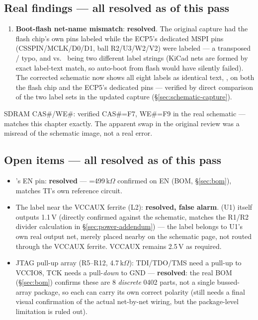 \subsection{Real findings --- all resolved as of this pass}
\begin{enumerate}
\item \textbf{Boot-flash net-name mismatch}: \textbf{resolved}. The
      original capture had the flash chip's own pins labeled
       while the ECP5's dedicated
      MSPI pins (CSSPIN/MCLK/D0/D1, ball R2/U3/W2/V2) were labeled
       --- a transposed
      / typo, and  vs.\ 
      being two different label strings (KiCad nets are formed by
      exact label-text match, so auto-boot from flash would have
      silently failed). The corrected schematic now shows all eight
      labels as identical text, ,
      on both the flash chip and the ECP5's dedicated pins --- verified
      by direct comparison of the two label sets in the updated
      capture (\S\ref{sec:schematic-capture}).
\end{enumerate}

\begin{fnnote}
SDRAM CAS\#/WE\#: verified CAS\#=F7, WE\#=F9 in the real schematic ---
matches this chapter exactly. The apparent swap in the original review
was a misread of the schematic image, not a real error.
\end{fnnote}

\subsection{Open items --- all resolved as of this pass}
\begin{itemize}
\item {}'s EN pin: \textbf{resolved} --- =499\,k$\Omega$
      confirmed on EN (BOM, \S\ref{sec:bom}), matches TI's own
      reference circuit.
\item The  label near the VCCAUX ferrite (L2): \textbf{resolved,
      false alarm}.  (U1) itself outputs 1.1\,V (directly
      confirmed against the schematic, matches the R1/R2 divider calculation in
      \S\ref{sec:power-addendum}) --- the label belongs to U1's own
      real output net, merely placed nearby on the schematic page, not
      routed through the VCCAUX ferrite. VCCAUX remains 2.5\,V as
      required.
\item JTAG pull-up array (R5--R12, 4.7\,k$\Omega$): TDI/TDO/TMS need a
      pull-up to VCCIO8, TCK needs a pull-\emph{down} to GND ---
      \textbf{resolved}: the real BOM (\S\ref{sec:bom}) confirms these
      are 8 \emph{discrete} 0402 parts, not a single bussed-array
      package, so each can carry its own correct polarity (still
      needs a final visual confirmation of the actual net-by-net
      wiring, but the package-level limitation is ruled out).
\end{itemize}

